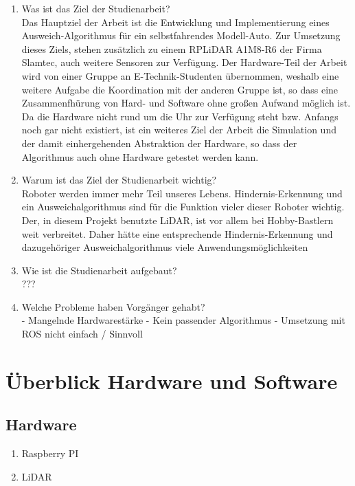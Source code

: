 \documentclass[12pt]{article}
\begin{document}
\begin{enumerate}
    \item Was ist das Ziel der Studienarbeit?\\
    Das Hauptziel der Arbeit ist die Entwicklung und Implementierung eines Ausweich-Algorithmus für ein selbstfahrendes Modell-Auto.
    Zur Umsetzung dieses Ziels, stehen zusätzlich zu einem RPLiDAR A1M8-R6 der Firma Slamtec, auch weitere Sensoren zur Verf{\"u}gung.
    Der Hardware-Teil der Arbeit wird von einer Gruppe an E-Technik-Studenten {\"u}bernommen, weshalb eine weitere Aufgabe die Koordination mit der anderen Gruppe ist, so dass eine Zusammenfh{\"u}rung von Hard- und Software ohne großen Aufwand m{\"o}glich ist.
    Da die Hardware nicht rund um die Uhr zur Verf{\"u}gung steht bzw. Anfangs noch gar nicht existiert, ist ein weiteres Ziel der Arbeit die Simulation und der damit einhergehenden Abstraktion der Hardware, so dass der Algorithmus auch ohne Hardware getestet werden kann.

    \item Warum ist das Ziel der Studienarbeit wichtig?\\
    Roboter werden immer mehr Teil unseres Lebens.
    Hindernis-Erkennung und ein Ausweichalgorithmus sind für die Funktion vieler dieser Roboter wichtig.
    Der, in diesem Projekt benutzte LiDAR, ist vor allem bei Hobby-Bastlern weit verbreitet.
    Daher hätte eine entsprechende Hindernis-Erkennung und dazugehöriger Ausweichalgorithmus viele Anwendungsm{\"o}glichkeiten

    \item Wie ist die Studienarbeit aufgebaut?\\
    ???

    \item Welche Probleme haben Vorgänger gehabt?\\
    - Mangelnde Hardwarestärke
    - Kein passender Algorithmus
    - Umsetzung mit ROS nicht einfach / Sinnvoll

\end{enumerate}

\section{Überblick Hardware und Software}

\subsection{Hardware}
\begin{enumerate}
    \item Raspberry PI\\
    \item LiDAR\\
\end{enumerate}
\end{document}

